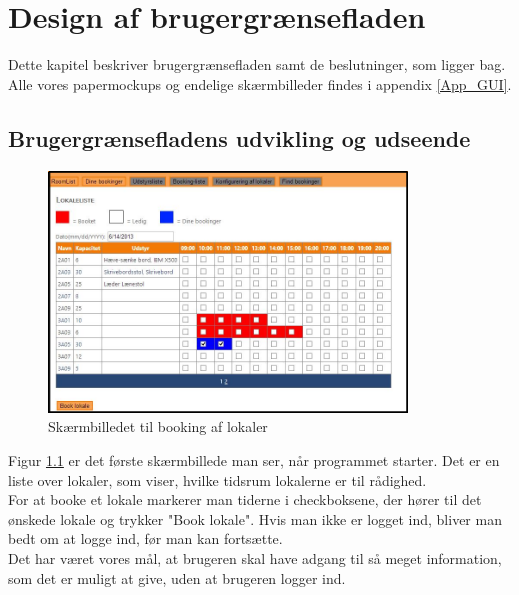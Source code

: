\chapter{Design af brugergrænsefladen}
\label{Design_G}
Dette kapitel beskriver brugergrænsefladen samt de beslutninger, som ligger bag. Alle vores papermockups og endelige skærmbilleder findes i appendix \ref{App_GUI}.

\section{Brugergrænsefladens udvikling og udseende}
\label{Design_G_Development}
\begin{figure}[h!]
  \centering
    \includegraphics[width=0.85\textwidth]{Appendix/GUI-Prototype/DigitalMockup/GridEksempel}
  \caption{Skærmbilledet til booking af lokaler}
\label{Design_G_Development_FinalGrid}
\end{figure}

Figur \ref{Design_G_Development_FinalGrid} er det første skærmbillede man ser, når programmet starter. Det er en liste over lokaler, som viser, hvilke tidsrum lokalerne er til rådighed.
\\For at booke et lokale markerer man tiderne i checkboksene, der hører til det ønskede lokale og trykker "Book lokale". Hvis man ikke er logget ind, bliver man bedt om at logge ind, før man kan fortsætte.
\\Det har været vores mål, at brugeren skal have adgang til så meget information, som det er muligt at give, uden at brugeren logger ind.

